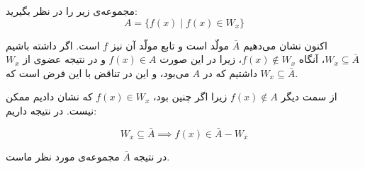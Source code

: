 مجموعه‌ی زیر را در نظر بگیرید:
$$A = \{f(x) \mid f(x)  \in W_x\}$$

اکنون نشان می‌دهیم $\bar{A}$ مولّد است و تابع مولّد آن نیز $f$ است. اگر داشته باشیم $W_x \subseteq \bar{A}$، آنگاه $f(x) \notin W_x$، زیرا در این صورت $f(x) \in A$ و در نتیجه عضوی از $W_x$ داشتیم که در $A$ می‌بود، و این در تناقض با این فرض است که $W_x \subseteq \bar{A}$.

از سمت دیگر $f(x) \notin A$ زیرا اگر چنین بود، $f(x) \in W_x$ که نشان دادیم ممکن نیست.
در نتیجه داریم:

$$W_x \subseteq \bar{A} \implies f(x) \in \bar{A} - W_x$$

در نتیجه $\bar{A}$ مجموعه‌ی مورد نظر ماست.

